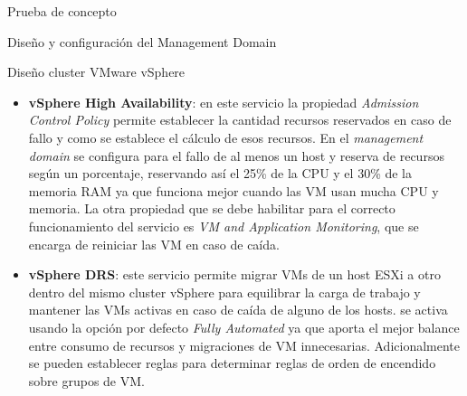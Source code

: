 \begin{section}{Prueba de concepto}
\begin{subsection}{Diseño y configuración del Management Domain}
\begin{subsubsection}{Diseño cluster VMware vSphere}
    \begin{itemize}
        \item \textbf{vSphere High Availability}: en este servicio la propiedad \textit{Admission Control Policy} permite establecer la cantidad recursos reservados en caso de fallo y como se establece el cálculo de esos recursos. En el \textit{management domain} se configura para el fallo de al menos un host y reserva de recursos según un porcentaje, reservando así el 25\% de la CPU y el 30\% de la memoria RAM ya que funciona mejor cuando las VM usan mucha CPU y memoria. La otra propiedad que se debe habilitar para el correcto funcionamiento del servicio es \textit{VM and Application Monitoring}, que se encarga de reiniciar las VM en caso de caída.
        \item \textbf{vSphere DRS}: este servicio permite migrar VMs de un host ESXi a otro dentro del mismo cluster vSphere para equilibrar la carga de trabajo y mantener las VMs activas en caso de caída de alguno de los hosts. se activa usando la opción por defecto \textit{Fully Automated} ya que aporta el mejor balance entre consumo de recursos y migraciones de VM innecesarias. Adicionalmente se pueden establecer reglas para determinar reglas de orden de encendido sobre grupos de VM. 
    \end{itemize}
    \end{subsubsection}

\end{subsection}
\end{section}
